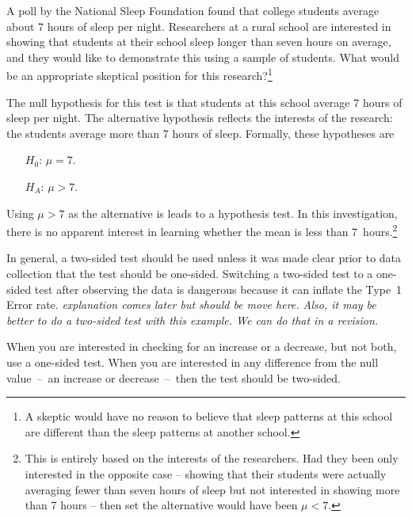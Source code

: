 \begin{spacing}{1.5}


\begin{exercise} \label{skepticalPerspOfRuralSchoolSleepExercise}
A poll by the National Sleep Foundation found that college students average about 7 hours of sleep per night. Researchers at a rural school are interested in showing that students at their school sleep longer than seven hours on average, and they would like to demonstrate this using a sample of students. What would be an appropriate skeptical position for this research?\footnote{A skeptic would have no reason to believe that sleep patterns at this school are different than the sleep patterns at another school.}
\end{exercise}

The null hypothesis for this test is that students at this school average 7 hours of sleep per night. The alternative hypothesis reflects the interests of the research: the students average more than 7 hours of sleep. Formally, these hypotheses are
\begin{itemize}
\setlength{\itemsep}{0mm}
\item[$H_0$:] $\mu = 7$.
\item[$H_A$:] $\mu > 7$.
\end{itemize}
Using $\mu > 7$ as the alternative is leads to a  hypothesis test. In this investigation, there is no apparent interest in learning whether the mean is less than 7~hours.\footnote{This is entirely based on the interests of the researchers. Had they been only interested in the opposite case -- showing that their students were actually averaging fewer than seven hours of sleep but not interested in showing more than 7 hours -- then set the alternative would have been $\mu < 7$.} 

In general, a two-sided test should be used unless it was made clear prior to data collection that the test should be one-sided. Switching a two-sided test to a one-sided test after observing the data is dangerous because it can inflate the Type~1 Error rate. \textit{explanation comes later but should be move here.  Also, it may be better to do a two-sided test with this example.  We can do that in a revision.}

\begin{tipBox}{
When you are interested in checking for an increase or a decrease, but not both, use a one-sided test. When you are interested in any difference from the null value~--~an increase or decrease~--~then the test should be two-sided.\vspace{0.5mm}}
\end{tipBox}


\end{spacing}
